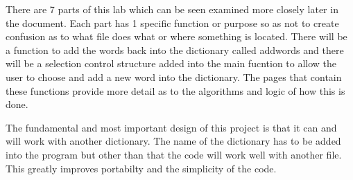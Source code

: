 There are 7 parts of this lab which can be seen examined more closely later in the document. Each part has 1 specific function or purpose so as not to create confusion as to what file does what or where something is located. There will be a function to add the words back into the dictionary called addwords and there will be a selection control structure added into the main fucntion to allow the user to choose and add a new word into the dictionary. The pages that contain these functions provide more detail as to the algorithms and logic of how this is done.

The fundamental and most important design of this project is that it can and will work with another dictionary. The name of the dictionary has to be added into the program but other than that the code will work well with another file. This greatly improves portabilty and the simplicity of the code. 